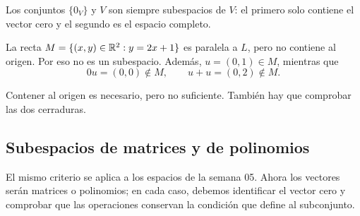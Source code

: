 \documentclass[compacto,10pt]{pubciencias-notas}
\begin{document}
Los conjuntos $\{0_V\}$ y $V$ son siempre subespacios de $V$:
el primero solo contiene el vector cero y el segundo es el espacio completo.

\begin{ejem}\label{sem06cl01:trasladada}
    La recta $M=\{(x,y)\in\mathbb{R}^2:y=2x+1\}$ es paralela a $L$,
    pero no contiene al origen. Por eso no es un subespacio.
    Además, $u=(0,1)\in M$, mientras que
    \[
        0u=(0,0)\notin M,\qquad u+u=(0,2)\notin M.
    \]
\end{ejem}

\begin{advertencia}
    Contener al origen es necesario, pero no suficiente. También hay que
    comprobar las dos cerraduras.
\end{advertencia}

\subsection{Subespacios de matrices y de polinomios}

El mismo criterio se aplica a los espacios de la semana 05. Ahora los
vectores serán matrices o polinomios; en cada caso, debemos identificar
el vector cero y comprobar que las operaciones conservan la condición
que define al subconjunto.
\end{document}
